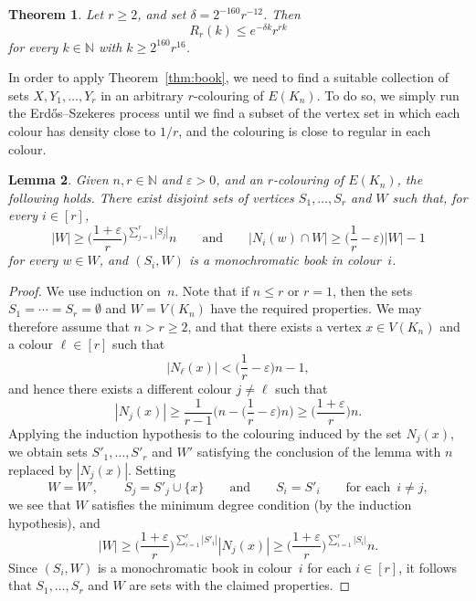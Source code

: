 \documentclass[12pt,reqno]{amsart}
\newtheorem{theorem}{Theorem}[section]
\newtheorem{lemma}[theorem]{Lemma}
\theoremstyle{definition}
\theoremstyle{remark}
\newcommand\N{\mathbb{N}}
\newcommand\eps{\varepsilon}
\renewcommand{\le}{\leqslant}
\renewcommand{\ge}{\geqslant}
\def\eps{\varepsilon}
\def\N{\mathbb{N}}
\begin{document}
\begin{theorem}\label{thm:Ramsey:multicolour:quant}
Let $r \ge 2$, and set $\delta = 2^{-160} r^{-12}$. Then
$$R_r(k) \le e^{-\delta k} r^{rk}$$ 
for every $k \in \N$ with $k \ge 2^{160} r^{16}$. 
\end{theorem}

In order to apply Theorem~\ref{thm:book}, we need to find a suitable collection of sets $X,Y_1,\ldots,Y_r$ in an arbitrary $r$-colouring of $E(K_n)$. To do so, we simply run the Erd\H{o}s--Szekeres process until we find a subset of the vertex set in which each colour has density close to $1/r$, and the colouring is close to regular in each colour. %

\begin{lemma}\label{lem:ESz:steps}
Given\/ $n,r \in \N$ and\/ $\eps > 0$, and an $r$-colouring of $E(K_n)$, the following holds. There exist disjoint sets of vertices\/ $S_1,\dots,S_r$ and\/ $W$ such that, for every $i \in [r]$, 
$$|W| \ge \bigg( \frac{1+\eps}{r} \bigg)^{\sum_{j = 1}^r |S_j|} n \qquad \text{and} \qquad |N_i(w) \cap W| \ge \bigg( \frac{1}{r} - \eps \bigg) |W| - 1$$ 
for every $w \in W$, and $(S_i,W)$ is a monochromatic book in colour~$i$.
\end{lemma}

\begin{proof}
We use induction on~$n$. Note that if $n \le r$ or $r = 1$, then the sets $S_1 = \cdots = S_r = \emptyset$ and $W = V(K_n)$ have the required properties. We may therefore assume that $n > r \ge 2$, and that there exists a vertex $x \in V(K_n)$ and a colour $\ell \in [r]$ such that
$$|N_\ell(x)| < \bigg( \frac{1}{r} - \eps \bigg) n - 1,$$
and hence there exists a different colour $j \ne \ell$ such that 
$$|N_j(x)| \ge \frac{1}{r-1} \bigg( n - \bigg( \frac{1}{r} - \eps \bigg) n \bigg) \ge \bigg( \frac{1 + \eps}{r} \bigg) n.$$
Applying the induction hypothesis to the colouring induced by the set $N_j(x)$, we obtain sets $S'_1,\ldots,S'_r$ and $W'$ satisfying the conclusion of the lemma with $n$ replaced by $|N_j(x)|$. Setting 
$$W = W', \qquad S_j = S'_j \cup \{x\} \qquad \text{and} \qquad S_i = S'_i \qquad \text{for each } \, i \ne j,$$ 
we see that $W$ satisfies the minimum degree condition (by the induction hypothesis), and
$$|W| \ge \bigg( \frac{1+\eps}{r} \bigg)^{\sum_{i = 1}^r |S'_i|}|N_j(x)| \ge \bigg( \frac{1+\eps}{r} \bigg)^{\sum_{i=1}^r |S_i|}n.$$
Since $(S_i,W)$ is a monochromatic book in colour~$i$ for each $i \in [r]$, it follows that $S_1,\dots,S_r$ and $W$ are sets with the claimed properties.
\end{proof}
\end{document}
